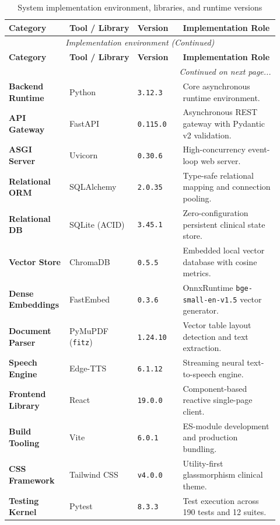 \small
\begin{longtable}{@{}p{0.18\linewidth} p{0.24\linewidth} p{0.16\linewidth} p{0.34\linewidth}@{}}
\caption{System implementation environment, libraries, and runtime versions}\label{tab:5_1_stack} \\
\toprule
\textbf{Category} & \textbf{Tool / Library} & \textbf{Version} & \textbf{Implementation Role} \\
\midrule
\endfirsthead
\toprule
\multicolumn{4}{c}{\small\textit{Implementation environment (Continued)}} \\[4pt]
\midrule
\textbf{Category} & \textbf{Tool / Library} & \textbf{Version} & \textbf{Implementation Role} \\
\midrule
\endhead
\midrule
\multicolumn{4}{r}{\footnotesize\textit{Continued on next page...}} \\
\bottomrule
\endfoot
\bottomrule
\endlastfoot
\textbf{Backend Runtime} & Python & \texttt{3.12.3} & Core asynchronous runtime environment. \\
\midrule
\textbf{API Gateway} & FastAPI & \texttt{0.115.0} & Asynchronous REST gateway with Pydantic v2 validation. \\
\midrule
\textbf{ASGI Server} & Uvicorn & \texttt{0.30.6} & High-concurrency event-loop web server. \\
\midrule
\textbf{Relational ORM} & SQLAlchemy & \texttt{2.0.35} & Type-safe relational mapping and connection pooling. \\
\midrule
\textbf{Relational DB} & SQLite (ACID) & \texttt{3.45.1} & Zero-configuration persistent clinical state store. \\
\midrule
\textbf{Vector Store} & ChromaDB & \texttt{0.5.5} & Embedded local vector database with cosine metrics. \\
\midrule
\textbf{Dense Embeddings} & FastEmbed & \texttt{0.3.6} & OnnxRuntime \texttt{bge-small-en-v1.5} vector generator. \\
\midrule
\textbf{Document Parser} & PyMuPDF (\texttt{fitz}) & \texttt{1.24.10} & Vector table layout detection and text extraction. \\
\midrule
\textbf{Speech Engine} & Edge-TTS & \texttt{6.1.12} & Streaming neural text-to-speech engine. \\
\midrule
\textbf{Frontend Library} & React & \texttt{19.0.0} & Component-based reactive single-page client. \\
\midrule
\textbf{Build Tooling} & Vite & \texttt{6.0.1} & ES-module development and production bundling. \\
\midrule
\textbf{CSS Framework} & Tailwind CSS & \texttt{v4.0.0} & Utility-first glassmorphism clinical theme. \\
\midrule
\textbf{Testing Kernel} & Pytest & \texttt{8.3.3} & Test execution across 190 tests and 12 suites. \\
\bottomrule
\end{longtable}
\normalsize


